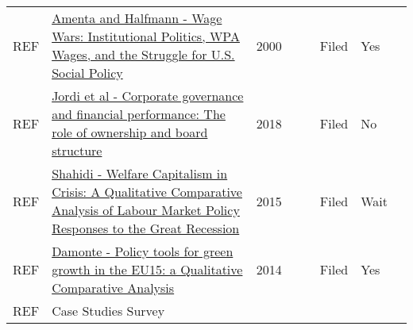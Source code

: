 \documentclass[11pt]{article}
\begin{document}
\begin{center}
\begin{tabular}{llrlllll}
REF & \href{https://www.jstor.org/stable/2657380}{Amenta and Halfmann - Wage Wars: Institutional Politics, WPA Wages, and the Struggle for U.S. Social Policy} & 2000 &  &  & Filed & Yes & \\
REF & \href{https://doi.org/10.1016/j.jbusres.2018.01.060}{Jordi et al - Corporate governance and financial performance: The role of ownership and board structure} & 2018 &  &  & Filed & No & \\
REF & \href{https://doi.org/10.1017/S004727941500029X}{Shahidi -  Welfare Capitalism in Crisis: A Qualitative Comparative Analysis of Labour Market Policy Responses to the Great Recession} & 2015 &  &  & Filed & Wait & \\
REF & \href{https://doi.org/10.1080/09644016.2013.817759}{Damonte - Policy tools for green growth in the EU15: a Qualitative Comparative Analysis} & 2014 &  &  & Filed & Yes & \\
REF & Case Studies Survey &  &  &  &  &  & \\
\end{tabular}
\end{center}



\end{document}

